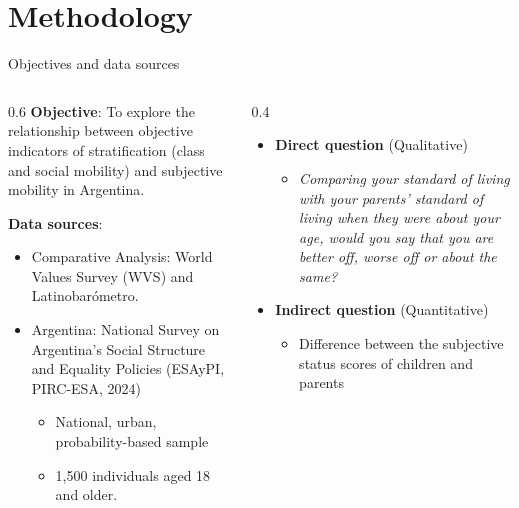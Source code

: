 \documentclass[
  ignorenonframetext,
  aspectratio=169,
]{beamer}
\providecommand{\tightlist}{%
  \setlength{\itemsep}{0pt}\setlength{\parskip}{0pt}}\usepackage{longtable,booktabs,array}
\begin{document}
\section{Methodology}\label{methodology}

\begin{frame}{Objectives and data sources}
\label{objectives-and-data-sources}
\begin{columns}[T]
\begin{column}{0.6\linewidth}
\textbf{Objective}: To explore the relationship between objective
indicators of stratification (class and social mobility) and subjective
mobility in Argentina.

\textbf{Data sources}:

\begin{itemize}
\item
  Comparative Analysis: World Values Survey (WVS) and Latinobarómetro.
\item
  Argentina: National Survey on Argentina's Social Structure and
  Equality Policies (ESAyPI, PIRC-ESA, 2024)

  \begin{itemize}
  \tightlist
  \item
    National, urban, probability-based sample
  \item
    1,500 individuals aged 18 and older.
  \end{itemize}
\end{itemize}
\end{column}

\begin{column}{0.4\linewidth}
\begin{itemize}
\tightlist
\item
  \textbf{Direct question} (Qualitative)

  \begin{itemize}
  \tightlist
  \item
    \emph{Comparing your standard of living with your parents' standard
    of living when they were about your age, would you say that you are
    better off, worse off or about the same?}
  \end{itemize}
\end{itemize}

\begin{itemize}
\tightlist
\item
  \textbf{Indirect question} (Quantitative)

  \begin{itemize}
  \tightlist
  \item
    Difference between the subjective status scores of children and
    parents
  \end{itemize}
\end{itemize}
\end{column}
\end{columns}
\end{frame}
\end{document}
